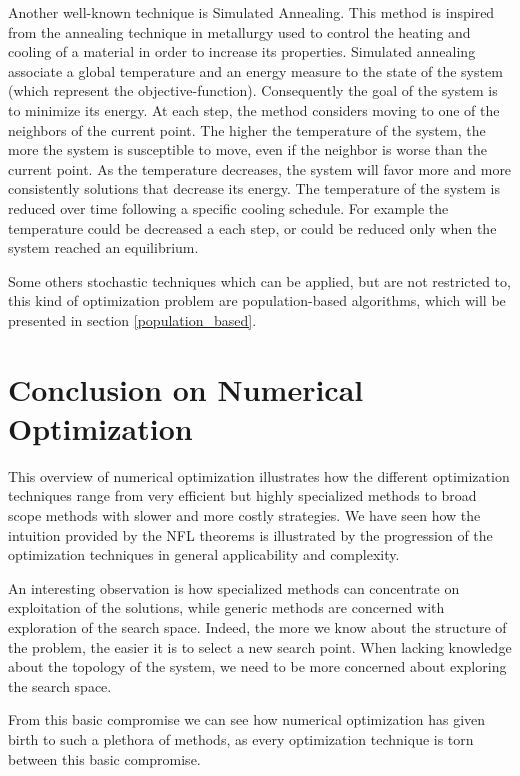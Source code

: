 Another well-known technique is Simulated Annealing. This method is inspired from the annealing technique in metallurgy used to control the heating and cooling of a material in order to increase its properties.
Simulated annealing associate a global temperature and an energy measure to the state of the system (which represent the objective-function). Consequently the goal of the system is to minimize its energy. At each step, the method considers moving to one of the neighbors of the current point. The higher the temperature of the system, the more the system is susceptible to move, even if the neighbor is worse than the current point. As the temperature decreases, the system will favor more and more consistently solutions that decrease its energy.
The temperature of the system is reduced over time following a specific cooling schedule. For example the temperature could be decreased a each step, or could be reduced only when the system reached an equilibrium.

Some others stochastic techniques which can be applied, but are not restricted to, this kind of optimization problem are population-based algorithms, which will be presented in section \ref{population_based}.

\section{Conclusion on Numerical Optimization}

This overview of numerical optimization illustrates how the different optimization techniques range from very efficient but highly specialized methods to broad scope methods with slower and more costly strategies.
We have seen how the intuition provided by the NFL theorems is illustrated by the progression of the optimization techniques in general applicability and complexity.

An interesting observation is how specialized methods can concentrate on exploitation of the solutions, while generic methods are concerned with exploration of the search space. Indeed, the more we know about the structure of the problem, the easier it is to select a new search point. When lacking knowledge about the topology of the system, we need to be more concerned about exploring the search space.

From this basic compromise we can see how numerical optimization has given birth to such a plethora of methods, as every optimization technique is torn between this basic compromise.

